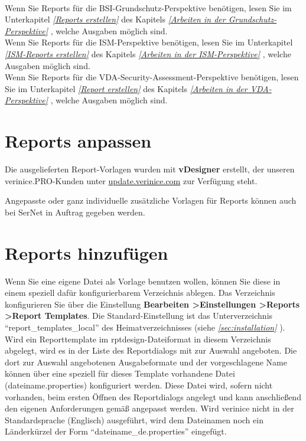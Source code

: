 \documentclass[a4paper,10pt]{book}
\begin{document}
\newline\\
Wenn Sie Reports für die BSI-Grundschutz-Perspektive benötigen, lesen Sie im Unterkapitel {\em \ref {Reports erstellen} } des Kapitels
{\em \ref{Arbeiten in der Grundschutz-Perspektive} }, welche Ausgaben möglich sind.
\newline\\
Wenn Sie Reports für die ISM-Perspektive benötigen, lesen Sie im Unterkapitel {\em \ref{ISM-Reports erstellen} } des Kapitels
{\em \ref{Arbeiten in der ISM-Perspektive} }, welche Ausgaben möglich sind.
\newline\\
Wenn Sie Reports für die VDA-Security-Assessment-Perspektive benötigen, lesen Sie im Unterkapitel {\em \ref{Report erstellen} } des
Kapitels {\em \ref{Arbeiten in der VDA-Perspektive} }, welche Ausgaben möglich sind.

\section{Reports anpassen}
Die ausgelieferten Report-Vorlagen wurden mit \textbf{vDesigner}
erstellt, der unseren verinice.PRO-Kunden unter
\href{https://update.verinice.com}{update.verinice.com} zur Verfügung
steht.

Angepasste oder ganz individuelle zusätzliche Vorlagen für Reports
können auch bei SerNet in Auftrag gegeben werden.

\section{Reports hinzufügen}
\label{sec:reports-hinzufuegen}


Wenn Sie eine eigene Datei als Vorlage benutzen wollen, können Sie
diese in einem speziell dafür konfigurierbarem Verzeichnis
ablegen. Das Verzeichnis konfigurieren Sie über die Einstellung
\textbf{Bearbeiten \textgreater Einstellungen \textgreater Reports
  \textgreater Report Templates}. Die Standard-Einstellung ist das
Unterverzeichnis ``report\_templates\_local'' des Heimatverzeichnisses
(siehe {\em \ref{sec:installation} }).  Wird
ein Reporttemplate im rptdesign-Dateiformat in diesem Verzeichnis
abgelegt, wird es in der Liste des Reportdialogs mit zur Auswahl
angeboten. Die dort zur Auswahl angebotenen Ausgabeformate und der
vorgeschlagene Name können über eine speziell für dieses Template
vorhandene Datei (dateiname.properties) konfiguriert werden. Diese
Datei wird, sofern nicht vorhanden, beim ersten Öffnen des
Reportdialogs angelegt und kann anschließend den eigenen Anforderungen
gemäß angepasst werden. Wird verinice nicht in der Standardsprache
(Englisch) ausgeführt, wird dem Dateinamen noch ein Länderkürzel
der Form ``dateiname\_de.properties'' eingefügt.\\
\end{document}
